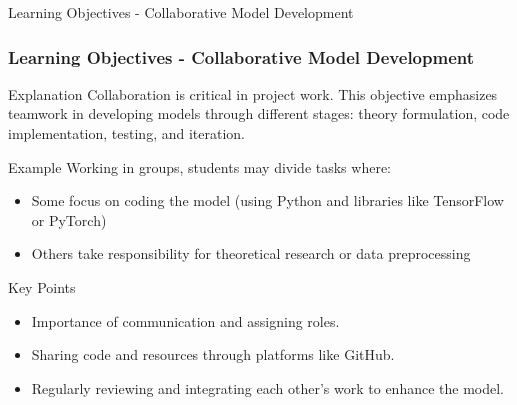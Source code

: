 \documentclass[aspectratio=169]{beamer}
\begin{document}
\begin{frame}[fragile]{Learning Objectives - Collaborative Model Development}
    \frametitle{Learning Objectives - Collaborative Model Development}
    \begin{block}{Explanation}
        Collaboration is critical in project work. This objective emphasizes teamwork in developing models through different stages: theory formulation, code implementation, testing, and iteration.
    \end{block}

    \begin{block}{Example}
        Working in groups, students may divide tasks where:
        \begin{itemize}
            \item Some focus on coding the model (using Python and libraries like TensorFlow or PyTorch)
            \item Others take responsibility for theoretical research or data preprocessing
        \end{itemize}
    \end{block}

    \begin{block}{Key Points}
        \begin{itemize}
            \item Importance of communication and assigning roles.
            \item Sharing code and resources through platforms like GitHub.
            \item Regularly reviewing and integrating each other's work to enhance the model.
        \end{itemize}
    \end{block}
\end{frame}
\end{document}
